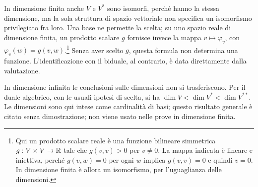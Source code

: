 \begin{osservazione}
In dimensione finita anche $V$ e $V^*$ sono isomorfi, perché hanno la stessa dimensione, ma la sola struttura di spazio vettoriale non specifica un isomorfismo privilegiato fra loro. Una base ne permette la scelta; su uno spazio reale di dimensione finita, un prodotto scalare $g$ fornisce invece la mappa $v\mapsto\varphi_v$, con $\varphi_v(w)=g(v,w)$.\footnote{Qui un prodotto scalare reale è una funzione bilineare simmetrica $g:V\times V\to\mathbb{R}$ tale che $g(v,v)>0$ per $v\ne0$. La mappa indicata è lineare e iniettiva, perché $g(v,w)=0$ per ogni $w$ implica $g(v,v)=0$ e quindi $v=0$. In dimensione finita è allora un isomorfismo, per l'uguaglianza delle dimensioni.} Senza aver scelto $g$, questa formula non determina una funzione. L'identificazione con il biduale, al contrario, è data direttamente dalla valutazione.

In dimensione infinita le conclusioni sulle dimensioni non si trasferiscono. Per il duale algebrico, con le usuali ipotesi di scelta, si ha $\dim V<\dim V^*<\dim V^{**}$. Le dimensioni sono qui intese come cardinalità di basi; questo risultato generale è citato senza dimostrazione; non viene usato nelle prove in dimensione finita.
\end{osservazione}
